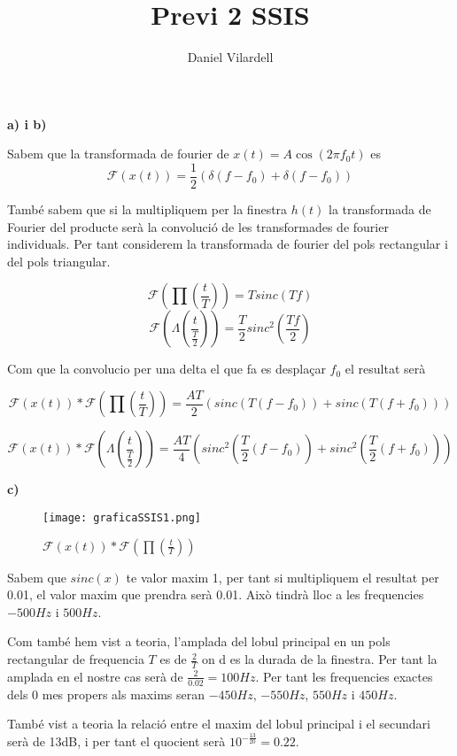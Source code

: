 \documentclass[12pt, a4papre]{article}
\author{Daniel Vilardell}
\title{Previ 2 SSIS }
\date{}
\begin{document}
	\maketitle
	\section{}
	
	\textbf{a) i b)}
	
	Sabem que la transformada de fourier de $x(t) =  A\cos{(2\pi f_0 t)} $ es
	\[\mathcal{F}(x(t)) = \frac{1}{2}(\delta(f - f_0) + \delta(f - f_0))\]
	
	També sabem que si la multipliquem per la finestra $h(t)$ la transformada de Fourier del producte serà la convolució de les transformades de fourier individuals. Per tant considerem la transformada de fourier del pols rectangular i del pols triangular.
	
	\[\mathcal{F}(\prod(\frac{t}{T})) = Tsinc(Tf)\]
	\[\mathcal{F}(\Lambda(\frac{t}{\frac{T}{2}})) = \frac{T}{2} sinc^2(\frac{Tf}{2}) \]
	
	Com que la convolucio per una delta el que fa es desplaçar $f_0$ el resultat serà 
	
	\[\mathcal{F}(x(t))*\mathcal{F}(\prod(\frac{t}{T})) = \frac{AT}{2}(sinc(T(f - f_0)) + sinc(T(f + f_0)))\]
	
	\[\mathcal{F}(x(t))*\mathcal{F}(\Lambda(\frac{t}{\frac{T}{2}})) = \frac{AT}{4}(sinc^2(\frac{T}{2}(f - f_0)) + sinc^2(\frac{T}{2}(f + f_0)))\]
	
	\newpage
	\textbf{c)}
	\begin{figure}[H]
		\begin{center}
		\texttt{[image: graficaSSIS1.png]}
		\end{center}
		\caption{$\mathcal{F}(x(t))*\mathcal{F}(\prod(\frac{t}{T}))$}
	\end{figure}
	
	Sabem que $sinc(x)$ te valor maxim 1, per tant si multipliquem el resultat per 0.01, el valor maxim que prendra serà 0.01. Això tindrà lloc a les frequencies $-500Hz$ i $500Hz$. 
	
	Com també hem vist a teoria, l'amplada del lobul principal en un pols rectangular de frequencia $T$ es de $\frac{2}{T}$ on d es la durada de la finestra. Per tant la amplada en el nostre cas serà de $\frac{2}{0.02} = 100Hz$. Per tant les frequencies exactes dels 0 mes propers als maxims seran $-450Hz$, $-550Hz$, $550Hz$ i $450Hz$.
	
	També vist a teoria la relació entre el maxim del lobul principal i el secundari serà de 13dB, i per tant el quocient serà $10^{-\frac{13}{20}} = 0.22$.
	
\end{document}
